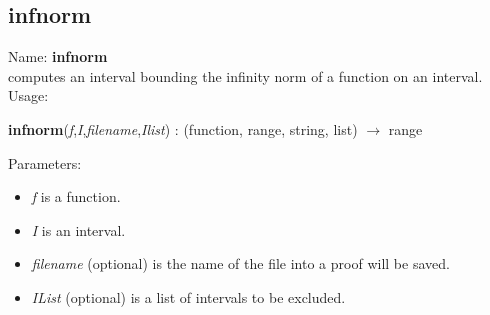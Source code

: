 \subsection{infnorm}
\label{labinfnorm}
\noindent Name: \textbf{infnorm}\\
computes an interval bounding the infinity norm of a function on an interval.\\

\noindent Usage: 
\begin{center}
\textbf{infnorm}(\emph{f},\emph{I},\emph{filename},\emph{Ilist}) : (\textsf{function}, \textsf{range}, \textsf{string}, \textsf{list}) $\rightarrow$ \textsf{range}\\
\end{center}
Parameters: 
\begin{itemize}
\item \emph{f} is a function.
\item \emph{I} is an interval.
\item \emph{filename} (optional) is the name of the file into a proof will be saved.
\item \emph{IList} (optional) is a list of intervals to be excluded.
\end{itemize}
